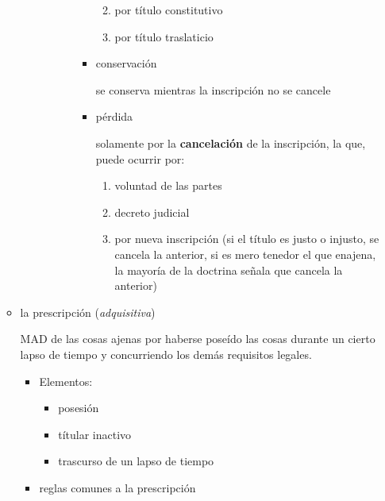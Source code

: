 \documentclass[]{article}
\providecommand{\tightlist}{%
  \setlength{\itemsep}{0pt}\setlength{\parskip}{0pt}}
\begin{document}
\begin{itemize}
\begin{itemize}
\begin{itemize}
\begin{itemize}
\begin{itemize}
\begin{itemize}
            \begin{enumerate}
            \def\labelenumi{\arabic{enumi}.}
            \tightlist
            \item
              por título constitutivo
            \item
              por título traslaticio
            \end{enumerate}
          \item
            conservación

            se conserva mientras la inscripción no se cancele
          \item
            pérdida

            solamente por la \textbf{cancelación} de la inscripción, la
            que, puede ocurrir por:

            \begin{enumerate}
            \def\labelenumi{\arabic{enumi}.}
            \tightlist
            \item
              voluntad de las partes
            \item
              decreto judicial
            \item
              por nueva inscripción (si el título es justo o injusto, se
              cancela la anterior, si es mero tenedor el que enajena, la
              mayoría de la doctrina señala que cancela la anterior)
            \end{enumerate}
          \end{itemize}
        \end{itemize}
      \end{itemize}
    \end{itemize}
  \item
    la prescripción (\emph{adquisitiva})

    MAD de las cosas ajenas por haberse poseído las cosas durante un
    cierto lapso de tiempo y concurriendo los demás requisitos legales.

    \begin{itemize}
    \tightlist
    \item
      Elementos:

      \begin{itemize}
      \tightlist
      \item
        posesión
      \item
        títular inactivo
      \item
        trascurso de un lapso de tiempo
      \end{itemize}
    \item
      reglas comunes a la prescripción


\end{itemize}
\end{itemize}
\end{itemize}
\end{document}
